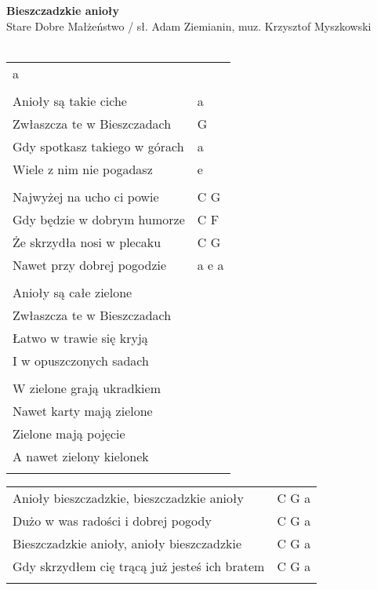 \documentclass[a5paper]{article}
\begin{document}


\noindent
\fontsize{12pt}{15pt}\selectfont
\textbf{Bieszczadzkie anioły} \\
\fontsize{8pt}{10pt}\selectfont
Stare Dobre Małżeństwo / sł. Adam Ziemianin, muz. Krzysztof Myszkowski \\ \\
\fontsize{10pt}{12pt}\selectfont
{}
\begin{tabular}{@{}p{9cm}p{3cm}@{}}
\noindent
a \\ \\

Anioły są takie ciche & a \\
Zwłaszcza te w Bieszczadach & G \\                       
Gdy spotkasz takiego w górach & a \\
Wiele z nim nie pogadasz & e \\ \\
  
Najwyżej na ucho ci powie & C G \\
Gdy będzie w dobrym humorze & C F \\
Że skrzydła nosi w plecaku & C G \\
Nawet przy dobrej pogodzie & a e a \\ \\
 
Anioły są całe zielone \\
Zwłaszcza te w Bieszczadach \\
Łatwo w trawie się kryją \\
I w opuszczonych sadach \\ \\
 
W zielone grają ukradkiem \\
Nawet karty mają zielone \\
Zielone mają pojęcie \\
A nawet zielony kielonek \\ \\
\end{tabular}

\noindent
\begin{tabular}{@{}p{8cm}p{3cm}@{}} 
Anioły bieszczadzkie, bieszczadzkie anioły & C G a \\
Dużo w was radości i dobrej pogody & C G a \\
Bieszczadzkie anioły, anioły bieszczadzkie & C G a \\
Gdy skrzydłem cię trącą już jesteś ich bratem & C G a \\ \\
\end{tabular}
\end{document}
